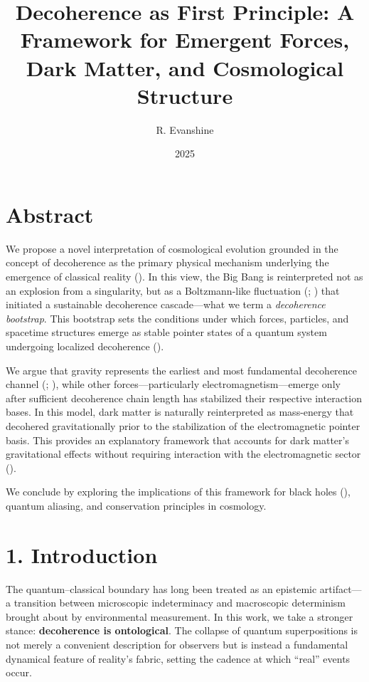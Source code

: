 \documentclass[
]{article}
\title{Decoherence as First Principle: A Framework for Emergent Forces,
Dark Matter, and Cosmological Structure}
\author{R. Evanshine}
\date{2025}
\begin{document}
\maketitle

\section{Abstract}\label{abstract}

We propose a novel interpretation of cosmological evolution grounded in
the concept of decoherence as the primary physical mechanism underlying
the emergence of classical reality (). In this view, the Big Bang is reinterpreted not as an explosion
from a singularity, but as a Boltzmann-like fluctuation
(;
) that initiated a sustainable
decoherence cascade---what we term a \emph{decoherence bootstrap}. This
bootstrap sets the conditions under which forces, particles, and
spacetime structures emerge as stable pointer states of a quantum system
undergoing localized decoherence ().

We argue that gravity represents the earliest and most fundamental
decoherence channel (;
), while other
forces---particularly electromagnetism---emerge only after sufficient
decoherence chain length has stabilized their respective interaction
bases. In this model, dark matter is naturally reinterpreted as
mass-energy that decohered gravitationally prior to the stabilization of
the electromagnetic pointer basis. This provides an explanatory
framework that accounts for dark matter's gravitational effects without
requiring interaction with the electromagnetic sector
().

We conclude by exploring the implications of this framework for black
holes (), quantum aliasing, and conservation principles in cosmology.
\newpage

\section{1. Introduction}\label{introduction}

The quantum--classical boundary has long been treated as an epistemic
artifact---a transition between microscopic indeterminacy and
macroscopic determinism brought about by environmental measurement. In
this work, we take a stronger stance: \textbf{decoherence is
ontological}. The collapse of quantum superpositions is not merely a
convenient description for observers but is instead a fundamental
dynamical feature of reality's fabric, setting the cadence at which
``real'' events occur.
\end{document}
